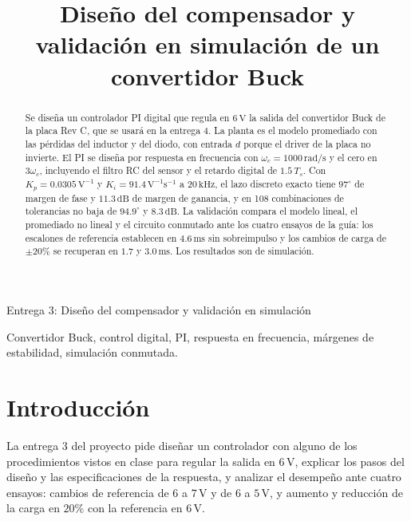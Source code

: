 \documentclass[conference,letterpaper]{IEEEtran}
\newcommand{\unit}[1]{\,\mathrm{#1}}
\begin{document}
\title{Diseño del compensador y validación en simulación de un convertidor Buck}
\author{
}
\maketitle
\begin{center}\small Entrega 3: Diseño del compensador y validación en simulación\end{center}

\begin{abstract}
Se diseña un controlador PI digital que regula en $6\unit{V}$ la salida del convertidor Buck de la placa Rev C, que se usará en la entrega 4. La planta es el modelo promediado con las pérdidas del inductor y del diodo, con entrada $d$ porque el driver de la placa no invierte. El PI se diseña por respuesta en frecuencia con $\omega_c=1000\unit{rad/s}$ y el cero en $3\omega_c$, incluyendo el filtro RC del sensor y el retardo digital de $1.5\,T_s$. Con $K_p=0.0305\unit{V^{-1}}$ y $K_i=91.4\unit{V^{-1}s^{-1}}$ a $20\unit{kHz}$, el lazo discreto exacto tiene $97^\circ$ de margen de fase y $11.3\unit{dB}$ de margen de ganancia, y en 108 combinaciones de tolerancias no baja de $94.9^\circ$ y $8.3\unit{dB}$. La validación compara el modelo lineal, el promediado no lineal y el circuito conmutado ante los cuatro ensayos de la guía: los escalones de referencia establecen en $4.6\unit{ms}$ sin sobreimpulso y los cambios de carga de $\pm20\%$ se recuperan en $1.7$ y $3.0\unit{ms}$. Los resultados son de simulación.
\end{abstract}
\begin{IEEEkeywords}Convertidor Buck, control digital, PI, respuesta en frecuencia, márgenes de estabilidad, simulación conmutada.\end{IEEEkeywords}

\section{Introducción}
La entrega 3 del proyecto \cite{guide} pide diseñar un controlador con alguno de los procedimientos vistos en clase para regular la salida en $6\unit{V}$, explicar los pasos del diseño y las especificaciones de la respuesta, y analizar el desempeño ante cuatro ensayos: cambios de referencia de $6$ a $7\unit{V}$ y de $6$ a $5\unit{V}$, y aumento y reducción de la carga en $20\%$ con la referencia en $6\unit{V}$.
\end{document}
